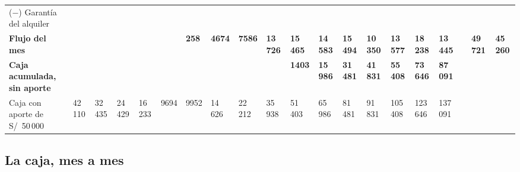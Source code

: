 \documentclass[10.5pt,a4paper]{article}
\begin{document}
\begin{landscape}
{\begin{tabular}{@{}l*{19}{Q}@{}}
(−) Garantía del alquiler &  &  &  &  &  &  &  &  &  &  &  &  &  &  &  &  &  &  &  \\
\textbf{Flujo del mes} & \textbf{} & \textbf{} & \textbf{} & \textbf{} & \textbf{} & \textbf{258} & \textbf{4674} & \textbf{7586} & \textbf{13\,726} & \textbf{15\,465} & \textbf{14\,583} & \textbf{15\,494} & \textbf{10\,350} & \textbf{13\,577} & \textbf{18\,238} & \textbf{13\,445} & \textbf{} & \textbf{49\,721} & \textbf{45\,260} \\
\midrule
\textbf{Caja acumulada, sin aporte} & \textbf{} & \textbf{} & \textbf{} & \textbf{} & \textbf{} & \textbf{} & \textbf{} & \textbf{} & \textbf{} & \textbf{1403} & \textbf{15\,986} & \textbf{31\,481} & \textbf{41\,831} & \textbf{55\,408} & \textbf{73\,646} & \textbf{87\,091} &  &  &  \\
{\color{tenue}Caja con aporte de S/~50\,000} & {\color{tenue}42\,110} & {\color{tenue}32\,435} & {\color{tenue}24\,429} & {\color{tenue}16\,233} & {\color{tenue}9694} & {\color{tenue}9952} & {\color{tenue}14\,626} & {\color{tenue}22\,212} & {\color{tenue}35\,938} & {\color{tenue}51\,403} & {\color{tenue}65\,986} & {\color{tenue}81\,481} & {\color{tenue}91\,831} & {\color{tenue}105\,408} & {\color{tenue}123\,646} & {\color{tenue}137\,091} &  &  &  \\
\bottomrule
\end{tabular}}
\end{landscape}

\subsection{La caja, mes a mes}
\end{document}
